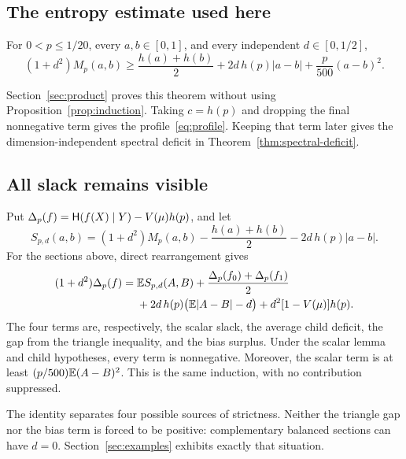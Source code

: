 \subsection{The entropy estimate used here}
\begin{theorem}\label{lem:mixing}\label{thm:linear-mixing}
For $0<p\le1/20$, every $a,b\in[0,1]$, and every independent $d\in[0,1/2]$,
\begin{equation}\label{eq:mixing}
 (1+d^2)M_p(a,b)\ge\frac{h(a)+h(b)}2+
 2d\,h(p)|a-b|+\frac p{500}(a-b)^2.
\end{equation}
\end{theorem}
Section~\ref{sec:product} proves this theorem without using Proposition~\ref{prop:induction}. Taking $c=h(p)$ and dropping the final nonnegative term gives the profile~\eqref{eq:profile}. Keeping that term later gives the dimension-independent spectral deficit in Theorem~\ref{thm:spectral-deficit}.

\subsection{All slack remains visible}
\begin{remark}\label{rem:deficit}
Put $\Delta_p(f)=\mathsf H(f(X)\mid Y)-V(\mu)h(p)$, and let
\[
S_{p,d}(a,b)=(1+d^2)M_p(a,b)-\frac{h(a)+h(b)}2-2d\,h(p)|a-b|.
\]
For the sections above, direct rearrangement gives
\begin{align}\label{eq:deficit}
(1+d^2)\Delta_p(f)
={}&\mathbb E S_{p,d}(A,B)+\frac{\Delta_p(f_0)+\Delta_p(f_1)}2\notag\\
&+2d\,h(p)\bigl(\mathbb E|A-B|-d\bigr)
+d^2[1-V(\mu)]h(p).
\end{align}
The four terms are, respectively, the scalar slack, the average child deficit, the gap from the triangle inequality, and the bias surplus. Under the scalar lemma and child hypotheses, every term is nonnegative. Moreover, the scalar term is at least $(p/500)\mathbb E(A-B)^2$. This is the same induction, with no contribution suppressed.
\end{remark}
The identity separates four possible sources of strictness. Neither the triangle gap nor the bias term is forced to be positive: complementary balanced sections can have $d=0$. Section~\ref{sec:examples} exhibits exactly that situation.

